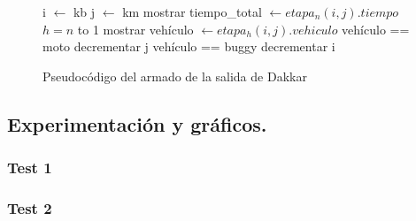 \begin{figure}[!ht]
\begin{codebox}
\li i $\leftarrow$ kb
\li j $\leftarrow$ km
\li mostrar tiempo_total $\leftarrow etapa_n(i,j).tiempo$
\li \For $h = n$ to 1
\li 		\Do 
			mostrar vehículo $\leftarrow etapa_h(i,j).vehiculo$
\li			\If vehículo == moto
\li				\Do decrementar j
\li 			\Else \If vehículo == buggy
\li					\Do decrementar i
					\End
			\End
		\End
\end{codebox} 
\caption{Pseudocódigo del armado de la salida de Dakkar}\label{code:dakkar.salida}
\end{figure}

\vspace*{0.6cm}
\subsection{Experimentación y gráficos.}

\vspace*{0.3cm}

\subsubsection{Test 1}

\vspace*{0.3cm}

\vspace*{0.6cm}
\subsubsection{Test 2}

\vspace*{0.3cm}

